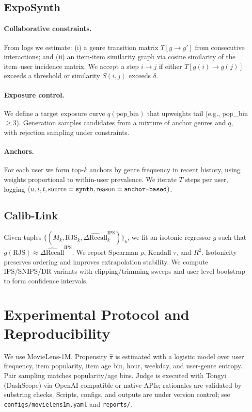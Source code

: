 \documentclass[sigconf,anonymous,review]{acmart}
\begin{document}
\subsection{ExpoSynth}
\label{sec:exposynth}
\paragraph{Collaborative constraints.} From logs we estimate: (i) a genre transition matrix \(T[g\to g']\) from consecutive interactions; and (ii) an item-item similarity graph via cosine similarity of the item–user incidence matrix. We accept a step \(i\to j\) if either \(T[g(i)\to g(j)]\) exceeds a threshold or similarity \(S(i,j)\) exceeds \(\delta\).

\paragraph{Exposure control.} We define a target exposure curve \(q(\mathrm{pop\_bin})\) that upweights tail (e.g., pop\_bin\(\ge 3\)). Generation samples candidates from a mixture of anchor genres and \(q\), with rejection sampling under constraints.

\paragraph{Anchors.} For each user we form top-\(k\) anchors by genre frequency in recent history, using weights proportional to within-user prevalence. We iterate \(T\) steps per user, logging \((u,i,t,\mathrm{source}=\text{\tt synth}, \mathrm{reason}=\text{\tt anchor\mbox{-}based})\).

\subsection{Calib-Link}
\label{sec:calib}
Given tuples \(\{(M_k, \mathrm{RJS}_k, \widehat{\Delta \mathrm{Recall}}^{\mathrm{IPS}}_{k})\}_k\), we fit an isotonic regressor \(g\) such that \(g(\mathrm{RJS})\approx \widehat{\Delta \mathrm{Recall}}^{\mathrm{IPS}}\). We report Spearman \(\rho\), Kendall \(\tau\), and \(R^2\). Isotonicity preserves ordering and improves extrapolation stability. We compute IPS/SNIPS/DR variants with clipping/trimming sweeps and user-level bootstrap to form confidence intervals.

\section{Experimental Protocol and Reproducibility}
We use MovieLens-1M. Propensity \(\hat{\pi}\) is estimated with a logistic model over user frequency, item popularity, item age bin, hour, weekday, and user-genre entropy. Pair sampling matches popularity/age bins. Judge is executed with Tongyi (DashScope) via OpenAI-compatible or native APIs; rationales are validated by substring checks. Scripts, configs, and outputs are under version control; see \texttt{configs/movielens1m.yaml} and \texttt{reports/}.
\end{document}
